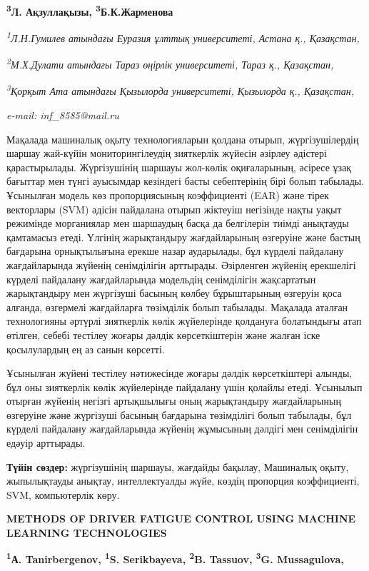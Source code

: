 {\bfseries \textsuperscript{3}Л. Ақзуллақызы,
\textsuperscript{3}Б.К.Жарменова}

\emph{\textsuperscript{1}Л.Н.Гумилев атындағы Еуразия ұлттық
университеті, Астана қ., Қазақстан,}

\emph{\textsuperscript{2}М.Х.Дулати атындағы Тараз өңірлік университеті,
Тараз қ., Қазақстан,}

\emph{\textsuperscript{3}Қорқыт Ата атындағы Қызылорда университеті,
Қызылорда қ., Қазақстан,}

\emph{e-mail: inf\_8585@mail.ru}

Мақалада машиналық оқыту технологияларын қолдана отырып, жүргізушілердің
шаршау жай-күйін мониторингілеудің зияткерлік жүйесін әзірлеу әдістері
қарастырылады. Жүргізушінің шаршауы жол-көлік оқиғаларының, әсіресе ұзақ
бағыттар мен түнгі ауысымдар кезіндегі басты себептерінің бірі болып
табылады. Ұсынылған модель көз пропорциясының коэффициенті (EAR) және
тірек векторлары (SVM) әдісін пайдалана отырып жіктеуіш негізінде нақты
уақыт режимінде морганиялар мен шаршаудың басқа да белгілерін тиімді
анықтауды қамтамасыз етеді. Үлгінің жарықтандыру жағдайларының өзгеруіне
және бастың бағдарына орнықтылығына ерекше назар аударылады, бұл күрделі
пайдалану жағдайларында жүйенің сенімділігін арттырады. Әзірленген
жүйенің ерекшелігі күрделі пайдалану жағдайларында модельдің
сенімділігін жақсартатын жарықтандыру мен жүргізуші басының көлбеу
бұрыштарының өзгеруін қоса алғанда, өзгермелі жағдайларға төзімділік
болып табылады. Мақалада аталған технологияны әртүрлі зияткерлік көлік
жүйелерінде қолдануға болатындығы атап өтілген, себебі тестілеу жоғары
дәлдік көрсеткіштерін және жалған іске қосылулардың ең аз санын
көрсетті.

Ұсынылған жүйені тестілеу нәтижесінде жоғары дәлдік көрсеткіштері
алынды, бұл оны зияткерлік көлік жүйелерінде пайдалану үшін қолайлы
етеді. Ұсынылып отырған жүйенің негізгі артықшылығы оның жарықтандыру
жағдайларының өзгеруіне және жүргізуші басының бағдарына төзімділігі
болып табылады, бұл күрделі пайдалану жағдайларында жүйенің жұмысының
дәлдігі мен сенімділігін едәуір арттырады.

{\bfseries Түйін сөздер:} жүргізушінің шаршауы, жағдайды бақылау, Машиналық
оқыту, жыпылықтауды анықтау, интеллектуалды жүйе, көздің пропорция
коэффициенті, SVM, компьютерлік көру.

{\bfseries METHODS OF DRIVER FATIGUE CONTROL USING MACHINE LEARNING
TECHNOLOGIES}

{\bfseries \textsuperscript{1}А. Tanirbergenov, \textsuperscript{1}S.
Serikbayeva\textsuperscript{\envelope }, \textsuperscript{2}B. Tassuov,
\textsuperscript{3}G. Mussagulova,}

